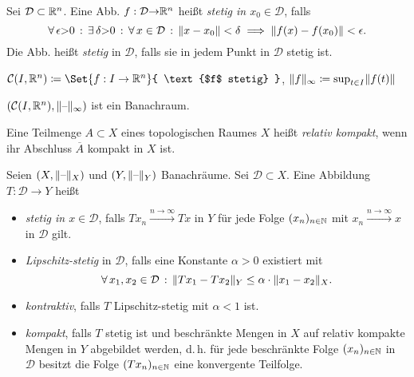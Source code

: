 \documentclass{cheat-sheet}
\newcommand{\D}{\mathcal{D}}
\begin{document}





\begin{defn}
  Sei $\D \subset \R^n$. Eine Abb. $f : \D {\to} \R^n$ heißt \emph{stetig in $x_0 \in \D$}, falls
  \[ \fa{\epsilon {>} 0} \ex{\delta {>} 0} \fa{x \in \D} \norm{x - x_0} < \delta \implies \norm{f(x) - f(x_0)} < \epsilon. \]
  Die Abb. heißt \emph{stetig} in $\D$, falls sie in jedem Punkt in $\D$ stetig ist.
\end{defn}

\begin{nota}
  $\mathcal{C}(I, \R^n) \coloneqq \Set{ f : I \to \R^n }{ \text{$f$ stetig} }$, $\lVert f\rVert_\infty \coloneqq \sup_{t \in I} \lVert f(t)\rVert$
\end{nota}


\begin{bem}
  $(\mathcal{C}(I, \mathbb{R}^n), \lVert\text{--}\rVert_\infty)$ ist ein Banachraum.
\end{bem}

\begin{defn}
  Eine Teilmenge $A \subset X$ eines topologischen Raumes $X$ heißt \emph{relativ kompakt}, wenn ihr Abschluss $\overline{A}$ kompakt in $X$ ist.
\end{defn}

\begin{defn}
  Seien $(X, \lVert\text{--}\rVert_X)$ und $(Y, \lVert\text{--}\rVert_Y)$ Banachräume. Sei $\D \subset X$. Eine Abbildung $T : \D \to Y$ heißt
  \begin{itemize}
    \item \emph{stetig in $x \in \D$}, falls $T x_n \xrightarrow{n \to \infty} T x$ in $Y$ für jede Folge $(x_n)_{n \in \mathbb{N}}$ mit $x_n \xrightarrow{n \to \infty} x$ in $\D$ gilt.
    \item \emph{Lipschitz-stetig} in $\D$, falls eine Konstante $\alpha > 0$ existiert mit
    \[ \fa{x_1, x_2 \in \D} \norm{Tx_1 - Tx_2}_Y \leq \alpha \cdot \norm{x_1 - x_2}_X. \]
    \item \emph{kontraktiv}, falls $T$ Lipschitz-stetig mit $\alpha < 1$ ist.
    \item \emph{kompakt}, falls $T$ stetig ist und beschränkte Mengen in $X$ auf relativ kompakte Mengen in $Y$ abgebildet werden, d.\,h. für jede beschränkte Folge $(x_n)_{n \in \mathbb{N}}$ in $\D$ besitzt die Folge $(Tx_n)_{n \in \mathbb{N}}$ eine konvergente Teilfolge.
  \end{itemize}
\end{defn}
\end{document}
